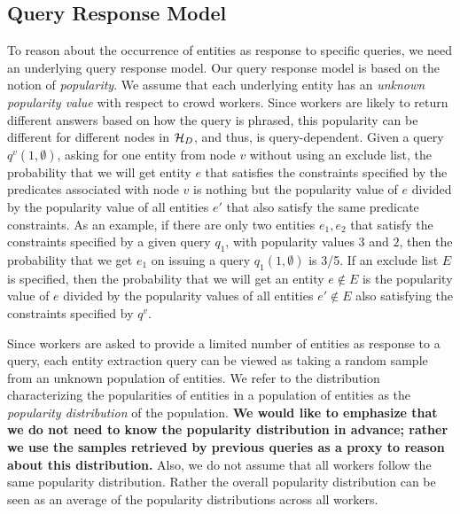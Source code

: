 \subsection{Query Response Model}
\label{sec:sampling}
To reason about the occurrence of entities as response to specific queries, we need an underlying query response model. Our query response model is based on the notion of {\em popularity}.
\ifpaper We assume that each underlying entity has an {\em unknown popularity value} with respect to crowd workers. Since workers are likely to return different answers based on how the query is phrased, this popularity can be different for different nodes in $\mathcal{H}_D$, and thus, is query-dependent. 
Given a query $q^v(1, \emptyset)$, asking for one entity from node $v$ without using an exclude list, the probability that we will get entity $e$ that satisfies the constraints specified by the predicates associated with node $v$ is nothing but the popularity value of $e$ divided by the popularity value of all entities $e'$ that also satisfy the same predicate constraints. As an example, if there are only two entities $e_1, e_2$ that satisfy the constraints specified by a given query $q_1$, with popularity values $3$ and $2$, then the probability that we get $e_1$ on issuing a query $q_1(1, \emptyset)$ is 3/5. If an exclude list $E$ is specified, then the probability that we will get an entity $e \notin E$ is the popularity value of $e$ divided by the popularity values of all entities $e' \notin E$ also satisfying the constraints specified by $q^v$. 

Since workers are asked to provide a limited number of entities as response to a query, each entity extraction query can be viewed as taking a random sample from an unknown population of entities. We refer to the distribution characterizing the popularities of entities in a population of entities as the {\em popularity distribution} of the population. {\bf We would like to emphasize that we do not need to know the popularity distribution in advance; rather we use the samples retrieved by previous queries as a proxy to reason about this distribution.} Also, we do not assume that all workers follow the same popularity distribution. Rather the overall popularity distribution can be seen as an average of the popularity distributions across all workers.

